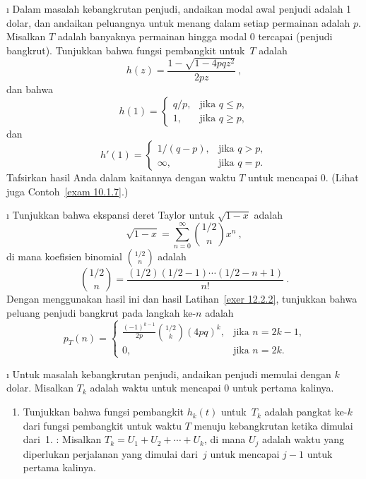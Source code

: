 \exercises
\begin{LJSItem}
 
\i\label{exer 12.2.2} Dalam masalah kebangkrutan penjudi, andaikan modal awal
penjudi adalah 1 dolar, dan andaikan peluangnya untuk menang dalam setiap
permainan adalah $p$. Misalkan $T$ adalah banyaknya permainan hingga modal 0
tercapai (penjudi bangkrut). Tunjukkan bahwa fungsi pembangkit untuk~$T$ adalah
$$
h(z) = \frac{1 - \sqrt{1 - 4pqz^2}}{2pz}\ ,
$$
dan bahwa
$$
h(1) = \left \{ \begin{array}{ll}
              q/p, & \mbox{jika $q \leq p$}, \\
                1, & \mbox{jika $q \geq p,$} 
         \end{array}
         \right.    
$$
dan
$$
h'(1) = \left \{ \begin{array}{ll}
               1/(q - p), & \mbox{jika $q > p$}, \\
                  \infty, & \mbox{jika $q = p.$}
         \end{array}
         \right. 
$$
Tafsirkan hasil Anda dalam kaitannya dengan waktu $T$ untuk mencapai 0. (Lihat
juga Contoh~\ref{exam 10.1.7}.)

\i\label{exer 12.2.3} Tunjukkan bahwa ekspansi deret Taylor untuk $\sqrt{1 - x}$
adalah
$$
 \sqrt{1 - x} = \sum_{n = 0}^\infty  {{1/2} \choose n} x^n\ ,
$$
di mana koefisien binomial ${1/2} \choose n$ adalah
$$
{{1/2} \choose n} = \frac{(1/2)(1/2 - 1) \cdots (1/2 - n + 1)}{n!}\ .  
$$
Dengan menggunakan hasil ini dan hasil Latihan~\ref{exer 12.2.2}, tunjukkan
bahwa peluang penjudi bangkrut pada langkah ke-$n$ adalah
$$
p_T(n) = \left \{ \begin{array}{ll}
 \frac{(-1)^{k - 1}}{2p} {{1/2} \choose k} (4pq)^k, & \mbox{jika $n = 2k - 1$,} \\
                                                 0, & \mbox{jika $n = 2k$.}
                  \end{array}
         \right.   
$$

\i\label{exer 12.2.4} Untuk masalah kebangkrutan penjudi, andaikan penjudi
memulai dengan $k$ dolar. Misalkan $T_k$ adalah waktu untuk mencapai 0 untuk
pertama kalinya.

\begin{enumerate}
\item Tunjukkan bahwa fungsi pembangkit $h_k(t)$ untuk~$T_k$ adalah pangkat
ke-$k$ dari fungsi pembangkit untuk waktu $T$ menuju kebangkrutan ketika
dimulai dari~1. : Misalkan $T_k = U_1 + U_2 +\cdots+ U_k$, di
mana $U_j$ adalah waktu yang diperlukan perjalanan yang dimulai dari~$j$
untuk mencapai $j - 1$ untuk pertama kalinya.


\end{enumerate}
\end{LJSItem}
